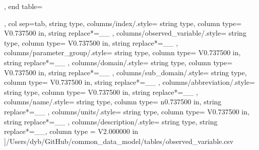 \begin{landscape}
\begin{longtable}
{{            \endlastfoot
        }
    },
    end table=\end{longtable},
    col sep=tab,
    string type,
    columns/index/.style={
            string type, 
            column type= V{0.737500 in}, 
            string replace*={_}{\_}
        },
    columns/observed_variable/.style={
            string type, 
            column type= V{0.737500 in}, 
            string replace*={_}{\_}
        },
    columns/parameter_group/.style={
            string type, 
            column type= V{0.737500 in}, 
            string replace*={_}{\_}
        },
    columns/domain/.style={
            string type, 
            column type= V{0.737500 in}, 
            string replace*={_}{\_}
        },
    columns/sub_domain/.style={
            string type, 
            column type= V{0.737500 in}, 
            string replace*={_}{\_}
        },
    columns/abbreviation/.style={
            string type, 
            column type= V{0.737500 in}, 
            string replace*={_}{\_}
        },
    columns/name/.style={
            string type, 
            column type= n{0.737500 in}, 
            string replace*={_}{\_}
        },
    columns/units/.style={
            string type, 
            column type= V{0.737500 in}, 
            string replace*={_}{\_}
        },
    columns/description/.style={
            string type, 
            string replace*={_}{\_},
            column type = V{2.000000 in}
        }
    ]{/Users/dyb/GitHub/common_data_model/tables/observed_variable.csv}
\end{landscape}
